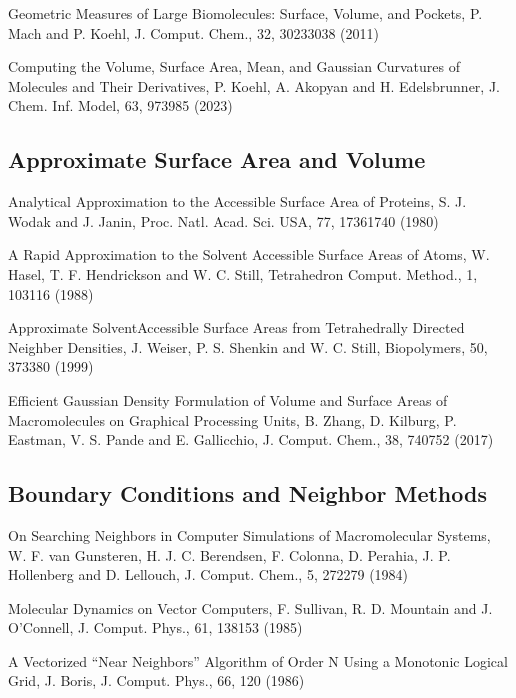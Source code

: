 \documentclass[letterpaper,11pt,english]{sphinxmanual}
\begin{document}
\sphinxAtStartPar
Geometric Measures of Large Biomolecules: Surface, Volume, and Pockets, P. Mach and P. Koehl, J. Comput. Chem., 32, 3023\sphinxhyphen{}3038 (2011)

\sphinxAtStartPar
Computing the Volume, Surface Area, Mean, and Gaussian Curvatures of Molecules and Their Derivatives, P. Koehl, A. Akopyan and H. Edelsbrunner, J. Chem. Inf. Model, 63, 973\sphinxhyphen{}985 (2023)


\subsection{Approximate Surface Area and Volume}
\label{\detokenize{text/references:approximate-surface-area-and-volume}}
\sphinxAtStartPar
Analytical Approximation to the Accessible Surface Area of Proteins, S. J. Wodak and J. Janin, Proc. Natl. Acad. Sci. USA, 77, 1736\sphinxhyphen{}1740 (1980)

\sphinxAtStartPar
A Rapid Approximation to the Solvent Accessible Surface Areas of Atoms, W. Hasel, T. F. Hendrickson and W. C. Still, Tetrahedron Comput. Method., 1, 103\sphinxhyphen{}116 (1988)

\sphinxAtStartPar
Approximate Solvent\sphinxhyphen{}Accessible Surface Areas from Tetrahedrally Directed Neighber Densities, J. Weiser, P. S. Shenkin and W. C. Still, Biopolymers, 50, 373\sphinxhyphen{}380 (1999)

\sphinxAtStartPar
Efficient Gaussian Density Formulation of Volume and Surface Areas of Macromolecules on Graphical Processing Units, B. Zhang, D. Kilburg, P. Eastman, V. S. Pande and E. Gallicchio, J. Comput. Chem., 38, 740\sphinxhyphen{}752 (2017)


\subsection{Boundary Conditions and Neighbor Methods}
\label{\detokenize{text/references:boundary-conditions-and-neighbor-methods}}
\sphinxAtStartPar
On Searching Neighbors in Computer Simulations of Macromolecular Systems, W. F. van Gunsteren, H. J. C. Berendsen, F. Colonna, D. Perahia, J. P. Hollenberg and D. Lellouch, J. Comput. Chem., 5, 272\sphinxhyphen{}279  (1984)

\sphinxAtStartPar
Molecular Dynamics on Vector Computers, F. Sullivan, R. D. Mountain and J. O’Connell, J. Comput. Phys., 61, 138\sphinxhyphen{}153 (1985)

\sphinxAtStartPar
A Vectorized “Near Neighbors” Algorithm of Order N Using a Monotonic Logical Grid, J. Boris, J. Comput. Phys., 66, 1\sphinxhyphen{}20 (1986)
\end{document}
